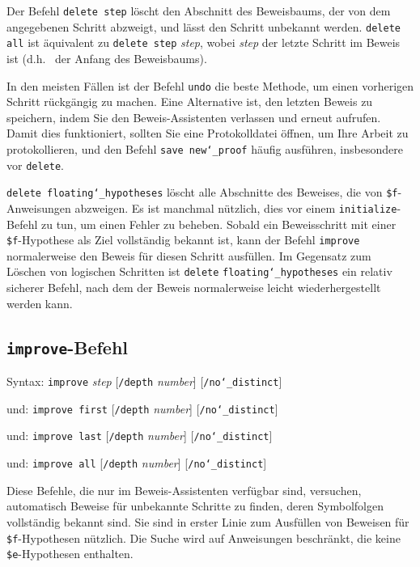 Der Befehl \texttt{delete step} löscht den Abschnitt des Beweisbaums, der von dem angegebenen Schritt abzweigt, und lässt den Schritt unbekannt werden. \texttt{delete all} ist äquivalent zu \texttt{delete step} {\em step}, wobei {\em step} der letzte Schritt im Beweis ist (d.h. \ der Anfang des Beweisbaums). 

In den meisten Fällen ist der Befehl \texttt{undo} die beste Methode, um einen vorherigen Schritt rückgängig zu machen. Eine Alternative ist, den letzten Beweis zu speichern, indem Sie den Beweis-Assistenten verlassen und erneut aufrufen. Damit dies funktioniert, sollten Sie eine Protokolldatei öffnen, um Ihre Arbeit zu protokollieren, und den Befehl \texttt{save new{\char`\_}proof} häufig ausführen, insbesondere vor \texttt{delete}. 

\texttt{delete floating{\char`\_}hypotheses} löscht alle Abschnitte des Beweises, die von \texttt{\$f}-Anweisungen abzweigen.  Es ist manchmal nützlich, dies vor einem \texttt{initialize}-Befehl zu tun, um einen Fehler zu beheben.  Sobald ein Beweis\-schritt mit einer \texttt{\$f}-Hypothese als Ziel vollständig bekannt ist, kann der Befehl \texttt{improve} normalerweise den Beweis für diesen Schritt ausfüllen.  Im Gegensatz zum Löschen von logischen Schritten ist \texttt{delete} \texttt{floating{\char`\_}hypotheses} ein relativ sicherer Befehl, nach dem der Beweis normalerweise leicht wiederhergestellt werden kann. 


\subsection{\texttt{improve}-Befehl}
\label{improve}

Syntax:  \texttt{improve} {\em step} [\texttt{/depth} {\em number}]
                                               [\texttt{/no{\char`\_}distinct}]

   und:   \texttt{improve first} [\texttt{/depth} {\em number}]
                                              [\texttt{/no{\char`\_}distinct}]

   und:   \texttt{improve last} [\texttt{/depth} {\em number}]
                                              [\texttt{/no{\char`\_}distinct}]

   und:   \texttt{improve all} [\texttt{/depth} {\em number}]
                                              [\texttt{/no{\char`\_}distinct}]

Diese Befehle, die nur im Beweis-Assistenten verfügbar sind, versuchen, automatisch Beweise für unbekannte Schritte zu finden, deren Symbolfolgen vollständig bekannt sind.  Sie sind in erster Linie zum Ausfüllen von Beweisen für \texttt{\$f}-Hypothesen nützlich.  Die Suche wird auf Anweisungen beschränkt, die keine \texttt{\$e}-Hypothesen enthalten. 

